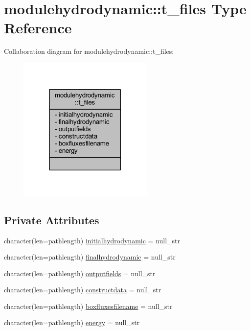 \hypertarget{structmodulehydrodynamic_1_1t__files}{}\section{modulehydrodynamic\+:\+:t\+\_\+files Type Reference}
\label{structmodulehydrodynamic_1_1t__files}


Collaboration diagram for modulehydrodynamic\+:\+:t\+\_\+files\+:\nopagebreak
\begin{figure}[H]
\begin{center}
\leavevmode
\includegraphics[width=189pt]{structmodulehydrodynamic_1_1t__files__coll__graph}
\end{center}
\end{figure}
\subsection*{Private Attributes}
\begin{DoxyCompactItemize}
\item 
character(len=pathlength) \mbox{\hyperlink{structmodulehydrodynamic_1_1t__files_aacbe8f6e7cac89474e4bf430d845e631}{initialhydrodynamic}} = null\+\_\+str
\item 
character(len=pathlength) \mbox{\hyperlink{structmodulehydrodynamic_1_1t__files_a474753ecb672f61f00f3b244965d1dc5}{finalhydrodynamic}} = null\+\_\+str
\item 
character(len=pathlength) \mbox{\hyperlink{structmodulehydrodynamic_1_1t__files_a5c82ec54e348f352e174c27cbce7683d}{outputfields}} = null\+\_\+str
\item 
character(len=pathlength) \mbox{\hyperlink{structmodulehydrodynamic_1_1t__files_a00eeb226882bd1a9c11d2bff2de14215}{constructdata}} = null\+\_\+str
\item 
character(len=pathlength) \mbox{\hyperlink{structmodulehydrodynamic_1_1t__files_a1435e11a05065defb424bcbd774c17e8}{boxfluxesfilename}} = null\+\_\+str
\item 
character(len=pathlength) \mbox{\hyperlink{structmodulehydrodynamic_1_1t__files_aee3e89023d10ffc7d17172c4c81d7183}{energy}} = null\+\_\+str
\end{DoxyCompactItemize}


